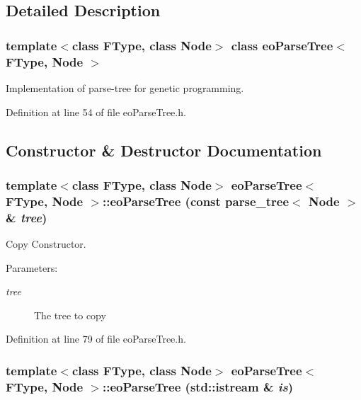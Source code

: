 \subsection{Detailed Description}
\subsubsection*{template$<$class FType, class Node$>$ class eo\-Parse\-Tree$<$ FType, Node $>$}

Implementation of parse-tree for genetic programming. 



Definition at line 54 of file eo\-Parse\-Tree.h.

\subsection{Constructor \& Destructor Documentation}
\subsubsection{\setlength{\rightskip}{0pt plus 5cm}template$<$class FType, class Node$>$ {\bf eo\-Parse\-Tree}$<$ FType, Node $>$::{\bf eo\-Parse\-Tree} (const parse\_\-tree$<$ Node $>$ \& {\em tree})\hspace{0.3cm}{\tt  [inline]}}\label{classeo_parse_tree_a1}


Copy Constructor. 

\begin{Desc}
\item[Parameters:]
\begin{description}
\item[{\em tree}]The tree to copy \end{description}
\end{Desc}


Definition at line 79 of file eo\-Parse\-Tree.h.
\subsubsection{\setlength{\rightskip}{0pt plus 5cm}template$<$class FType, class Node$>$ {\bf eo\-Parse\-Tree}$<$ FType, Node $>$::{\bf eo\-Parse\-Tree} (std::istream \& {\em is})\hspace{0.3cm}{\tt  [inline]}}\label{classeo_parse_tree_a3}


